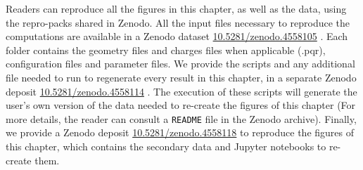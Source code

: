 Readers can reproduce all the figures in this chapter, as well as the data, using the repro-packs shared in Zenodo. 
All the input files necessary to reproduce the computations are available in a Zenodo dataset \href{https://doi.org/10.5281/zenodo.4558105}{10.5281/zenodo.4558105} \cite{Clementi2021-Zen_IF}. 
Each folder contains the geometry files and charges files when applicable (.pqr), configuration files and parameter files.
We provide the scripts and any additional file needed to run \pygbe to regenerate every result in this chapter, in a 
separate Zenodo deposit \href{https://doi.org/10.5281/zenodo.4558114}{10.5281/zenodo.4558114} \cite{Clementi2021-Zen_EF}. The execution of these scripts will generate the user's own version of the data 
needed to re-create the figures of this chapter (For more details, the reader can consult a \texttt{README} file in the Zenodo archive).
Finally, we provide a Zenodo deposit \href{https://doi.org/10.5281/zenodo.4558118}{10.5281/zenodo.4558118} \cite{Clementi2021-Zen_RP} to reproduce the figures of this chapter, which contains the secondary data and 
Jupyter notebooks to re-create them. 
